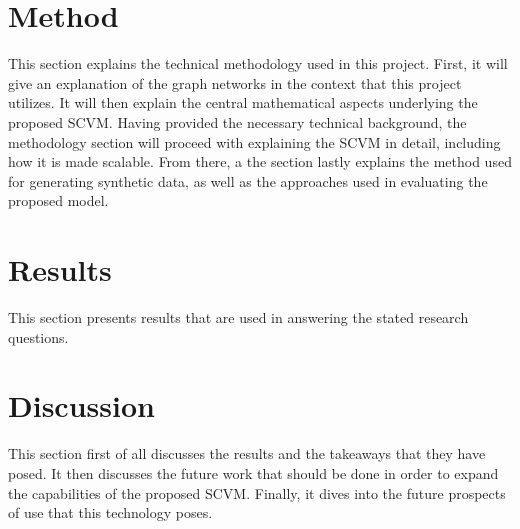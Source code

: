 \documentclass[11pt]{article}
\begin{document}

\clearpage



\section{Method}
\label{sec:Method}
This section explains the technical methodology used in this project.
First, it will give an explanation of the graph networks in the context that this project utilizes. 
It will then explain the central mathematical aspects underlying the proposed SCVM. 
Having provided the necessary technical background, the methodology section will proceed with explaining the SCVM in detail, including how it is made scalable.
From there, a the section lastly explains the method used for generating synthetic data, as well as the approaches used in evaluating the proposed model.










\clearpage

\newcommand{\bluehref}[3][blue]{\href{#2}{\color{#1}{#3}}}%


\clearpage

\section{Results}
\label{sec:Results}
This section presents results that are used in answering the stated research questions.


\clearpage

\clearpage

\clearpage

\section{Discussion}
\label{sec:Discussion}
This section first of all discusses the results and the takeaways that they have posed.
It then discusses the future work that should be done in order to expand the capabilities of the proposed SCVM.
Finally, it dives into the future prospects of use that this technology poses.



\clearpage



\clearpage

%
%
\printbibliography
\clearpage


\end{document}
